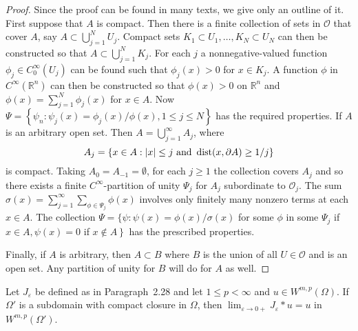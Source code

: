 \begin{proof}
  Since the proof can be found in many texts, we give only an outline of it.
  First suppose that $A$ is compact. Then there is a finite collection of sets in $\mathscr{O}$ 
  that cover $A$, say $A \subset \bigcup_{j=1}^N U_j$.
  Compact sets $K_1 \subset U_1, \ldots, K_N \subset U_N$ can then be constructed so that
  $A \subset \bigcup_{j=1}^N K_j$. For each $j$ a nonnegative-valued function
  $\phi_j \in C_0^{\infty}\left(U_j\right)$ can be found such that $\phi_j(x)>0$
  for $x \in K_j$. A function $\phi$ in $C^{\infty}\left(\mathbb{R}^n\right)$ can then be constructed so that $\phi(x)>0$ on $\mathbb{R}^n$ and $\phi(x)=\sum_{j=1}^N \phi_j(x)$
  for $x \in A$. Now $\Psi=\left\{\psi_n: \psi_j(x)=\phi_j(x) / \phi(x), 1 \leq j \leq N\right\}$ 
  has the required properties.
  If $A$ is an arbitrary open set. Then $A=\bigcup_{j=1}^{\infty} A_j$, where
  \[
  A_j=\{x \in A:|x| \leq j \text { and } \operatorname{dist}(x, \partial A) \geq 1 / j\}
  \]
  is compact. Taking $A_0=A_{-1}=\emptyset$, for each $j \geq 1$ the collection
  covers $A_j$ and so there exists a finite $C^{\infty}$-partition of unity $\Psi_j$ for $A_j$ subordinate to $\mathscr{O}_j$. The sum $\sigma(x)=\sum_{j=1}^{\infty} \sum_{\phi \in \Psi_j} \phi(x)$ involves only finitely many nonzero terms at each $x \in A$. The collection $\Psi=\{\psi: \psi(x)=\phi(x) / \sigma(x)$ for some $\phi$ in some $\Psi_j$ if $x \in A, \psi(x)=0$ if $\left.x \notin A\right\}$ has the prescribed properties.
  
  Finally, if $A$ is arbitrary, then $A \subset B$ where $B$ is the union of all $U \in \mathscr{O}$ and is an open set. Any partition of unity for $B$ will do for $A$ as well.
\end{proof}

\begin{lemma}
  Let $J_\varepsilon$ be defined as in Paragraph~2.28 and let $1 \leq p<\infty$ and $u \in W^{m, p}(\Omega)$. If $\Omega'$ is a subdomain with compact closure in $\Omega$, then $\lim _{\varepsilon \rightarrow 0+} J_\varepsilon * u=u$ in $W^{m,p}\left(\Omega'\right)$.
\end{lemma}

